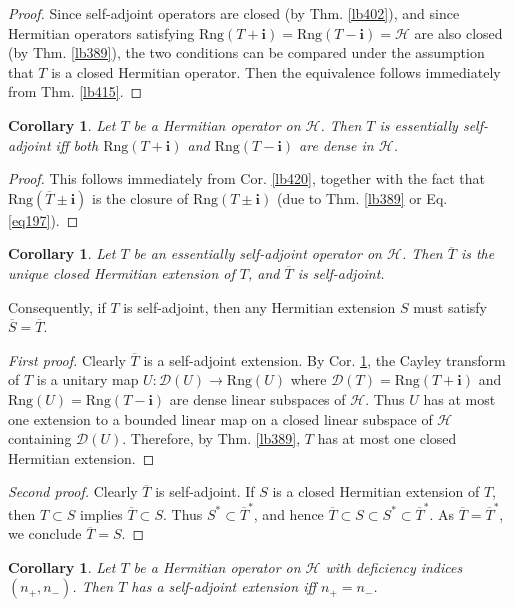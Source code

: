 \documentclass[12pt,b5paper,notitlepage]{article}
\theoremstyle{definition}
\theoremstyle{plain}
\newtheorem{co}[df]{Corollary}
\newcommand{\ovl}{\overline}
\newcommand{\Dom}{\mathscr{D}}
\newcommand{\im}{\mathbf{i}}
\newcommand{\Rng}{\mathrm{Rng}}
\newcommand{\MH}{\mathcal H}
\numberwithin{equation}{section}
\begin{document}
\begin{proof}
Since self-adjoint operators are closed (by Thm. \ref{lb402}), and since Hermitian operators satisfying $\Rng(T+\im)=\Rng(T-\im)=\MH$ are also closed (by Thm. \ref{lb389}), the two conditions can be compared under the assumption that $T$ is a closed Hermitian operator. Then the equivalence follows immediately from Thm. \ref{lb415}.
\end{proof}

\begin{co}\label{lb461}
Let $T$ be a Hermitian operator on $\MH$. Then $T$ is essentially self-adjoint iff both $\Rng(T+\im)$ and $\Rng(T-\im)$ are dense in $\MH$.
\end{co}

\begin{proof}
This follows immediately from Cor. \ref{lb420}, together with the fact that $\Rng(\ovl T\pm\im)$ is the closure of $\Rng(T\pm\im)$ (due to Thm. \ref{lb389} or Eq. \eqref{eq197}).
\end{proof}


\begin{co}\label{lb462}
Let $T$ be an essentially self-adjoint operator on $\MH$. Then $\ovl T$ is the unique closed Hermitian extension of $T$, and $\ovl T$ is self-adjoint.
\end{co}

Consequently, if $T$ is self-adjoint, then any Hermitian extension $S$ must satisfy $\ovl S=\ovl T$.

\begin{proof}[First proof]
Clearly $\ovl T$ is a self-adjoint extension. By Cor. \ref{lb461}, the Cayley transform of $T$ is a unitary map $U:\Dom(U)\rightarrow\Rng(U)$ where $\Dom(T)=\Rng(T+\im)$ and $\Rng(U)=\Rng(T-\im)$ are dense linear subspaces of $\MH$. Thus $U$ has at most one extension to a bounded linear map on a closed linear subspace of $\MH$ containing $\Dom(U)$. Therefore, by Thm. \ref{lb389}, $T$ has at most one closed Hermitian extension.
\end{proof}

\begin{proof}[Second proof]
Clearly $\ovl T$ is self-adjoint. If $S$ is a closed Hermitian extension of $T$, then $T\subset S$ implies $\ovl T\subset S$. Thus $S^*\subset\ovl T^*$, and hence $\ovl T\subset S\subset S^*\subset \ovl T^*$. As $\ovl T=\ovl T^*$, we conclude $\ovl T=S$.
\end{proof}



\begin{co}\label{lb424}
Let $T$ be a Hermitian operator on $\MH$ with deficiency indices $(n_+,n_-)$. Then $T$ has a self-adjoint extension iff $n_+=n_-$.
\end{co}
\end{document}
